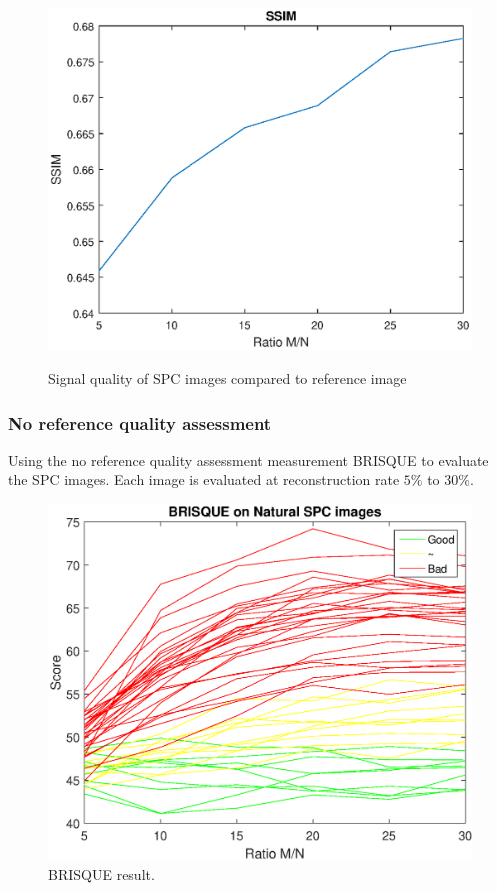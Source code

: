 \begin{figure}[H]
\begin{minipage}[t]{0.49\textwidth}
\end{minipage}
\begin{minipage}[t]{0.49\textwidth}
    \includegraphics[width=1\textwidth]{result/homo/hom_SSIM.eps}
    \label{fig:hom_ssim}
\end{minipage}
    \caption{Signal quality of SPC images compared to reference image}
    \label{fig:hom_score}
\end{figure}


\subsubsection{No reference quality assessment}
Using the no reference quality assessment measurement BRISQUE to evaluate the SPC images. Each image is evaluated at reconstruction rate $5\%$ to $30\%$.

\begin{figure}[H]
    \centering
    \includegraphics[width = 0.7\linewidth]{result/SPC_NRQA/plot.eps}
    \caption{BRISQUE result.}
    \label{fig:brisque_plot}
\end{figure}

